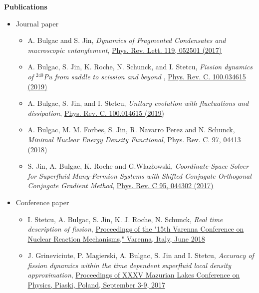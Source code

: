 \documentclass[letterpaper,12pt]{article}
\newcommand{\resheading}[1]{{\large \colorbox{mygrey}{\begin{minipage}{\textwidth}{\textbf{#1 \vphantom{p\^{E}}}}\end{minipage}}}}
\begin{document}

\resheading{Publications}

\begin{itemize}
\itemsep0em

\item Journal paper
\begin{itemize}
\item 
A. Bulgac and S. Jin, \textit{Dynamics of Fragmented Condensates and macroscopic entanglement},  \href{https://journals.aps.org/prl/abstract/10.1103/PhysRevLett.119.052501}{Phys. Rev. Lett. 119, 052501 (2017)}

\item
A. Bulgac, S. Jin, K. Roche, N. Schunck, and  I. Stetcu, \textit{Fission dynamics of $^{240}$Pu from saddle to scission and beyond }, \href{https://journals.aps.org/prc/abstract/10.1103/PhysRevC.100.034615}{Phys. Rev. C. 100.034615 (2019)}

\item
A. Bulgac, S. Jin, and I. Stetcu, \textit{Unitary evolution with fluctuations and dissipation},  \href{https://journals.aps.org/prc/abstract/10.1103/PhysRevC.100.014615}{Phys. Rev. C. 100.014615 (2019)}

\item
A. Bulgac, M. M. Forbes, S. Jin, R. Navarro Perez and N. Schunck, \textit{Minimal Nuclear Energy Density Functional}, \href{https://journals.aps.org/prc/abstract/10.1103/PhysRevC.97.044313}{ Phys. Rev. C. 97, 04413 (2018)}

\item
S. Jin, A. Bulgac, K. Roche and G.Wlaz\l{}owski, \textit{Coordinate-Space Solver for Superfluid Many-Fermion Systems with Shifted Conjugate Orthogonal Conjugate Gradient Method}, \href{https://journals.aps.org/prc/abstract/10.1103/PhysRevC.95.044302}{Phys. Rev. C 95, 044302 (2017)}
\end{itemize}

\item Conference paper
\begin{itemize}
\item
I. Stetcu, A. Bulgac, S. Jin, K. J. Roche, N. Schunck, \textit{Real time description of fission}, \href{https://arxiv.org/abs/1810.04024}{Proceedings of the "15th Varenna Conference on Nuclear Reaction Mechanisms," Varenna, Italy, June 2018}

\item
J. Grineviciute, P. Magierski, A. Bulgac, S. Jin and I. Stetcu, \textit{Accuracy of fission dynamics within the time dependent superfluid local density approximation}, \href{https://arxiv.org/abs/1711.02169}{Proceedings of XXXV Mazurian Lakes Conference on Physics, Piaski, Poland, September 3-9, 2017}


\end{itemize}
\end{itemize}
\end{document}

